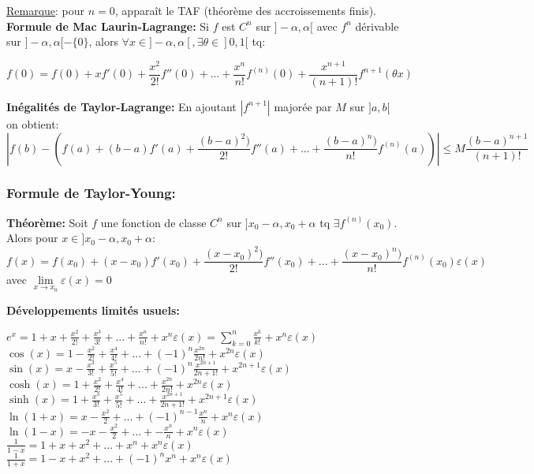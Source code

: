 \underline{Remarque}: pour $n=0$, apparaît le TAF (théorème des accroissements finis).
\\

\textbf{Formule de Mac Laurin-Lagrange:} Si $f$ est $C^n$ sur $]-\alpha, \alpha[$ avec $f^n$ dérivable sur $]-\alpha, \alpha[ - \{0\}$, alors $\forall x \in ]-\alpha, \alpha[, \exists \theta \in  ]0, 1[$ tq:

$$
    f(0) = f(0) + xf'(0) + \frac{x^2}{2!}f''(0) + ... + \frac{x^n}{n!}f^{(n)}(0) + \frac{x^{n+1}}{(n+1)!} f^{n+1}(\theta x)
$$

\textbf{Inégalités de Taylor-Lagrange:} En ajoutant $|f^{n+1}|$ majorée par $M$ sur $]a,b[$ on obtient:
$$
    | f(b) - ( f(a) + (b-a)f'(a) + \frac{(b-a)^2)}{2!}f''(a) + ... + \frac{(b-a)^n)}{n!}f^{(n)}(a) ) | \leq M\frac{(b-a)^{n+1}}{(n+1)!}
$$

\subsubsection{Formule de Taylor-Young:} 
\textbf{Théorème:} Soit $f$ une fonction de classe $C^n$ sur $]x_0 - \alpha, x_0 + \alpha$ tq $\exists f^{(n)}(x_0)$.
Alors pour $x \in ]x_0 - \alpha, x_0 + \alpha$:
$$f(x) = f(x_0) + (x-x_0)f'(x_0) + \frac{(x-x_0)^2)}{2!}f''(x_0) + ... + \frac{(x-x_0)^n)}{n!}f^{(n)}(x_0) \varepsilon (x)$$ avec $\lim\limits_{x \to x_0} \varepsilon (x) = 0$

\textbf{Développements limités usuels:}

$e^x = 1 + x + \frac{x^2}{2!} + \frac{x^3}{3!} + ... + \frac{x^n}{n!} + x^n \varepsilon (x) = \sum_{k=0} ^{n} \frac{x^k}{k!} + x^n\varepsilon (x)$\\
$\cos(x) = 1 - \frac{x^2}{2!} + \frac{x^4}{4!} + ... + (-1)^n\frac{x^{2n}}{2n!} + x^{2n} \varepsilon (x)$\\
$\sin(x) =  x - \frac{x^3}{3!} + \frac{x^5}{5!} + ... + (-1)^n\frac{x^{2n+1}}{2n+1!} + x^{2n+1} \varepsilon (x)$\\
$\cosh(x) = 1 + \frac{x^2}{2!} + \frac{x^4}{4!} + ... + \frac{x^{2n}}{2n!} + x^{2n} \varepsilon (x)$\\
$\sinh(x) = 1 + \frac{x^3}{3!} + \frac{x^5}{5!} + ... + \frac{x^{2n+1}}{2n+1!} + x^{2n+1} \varepsilon (x)$\\
$\ln(1+x) = x -\frac{x^2}{2} + ... + (-1)^{n-1}\frac{x^n}{n} + x^n \varepsilon (x)$\\
$\ln(1-x) = - x -\frac{x^2}{2} + ... + -\frac{x^n}{n} + x^n \varepsilon (x)$\\
$\frac{1}{1-x} = 1 + x + x^2 + ... + x^n + x^n \varepsilon (x)$\\
$\frac{1}{1+x} = 1 - x + x^2 + ... +(-1)^n x^n + x^n \varepsilon (x)$\\